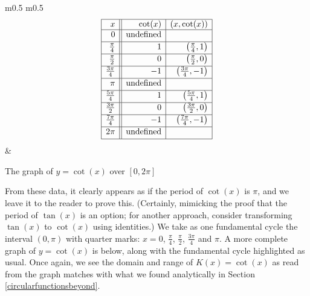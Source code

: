 \hskip-20pt\begin{minipage}{\textwidth}
\begin{center}
\begin{tabular}{m{} m{}}
\setlength{\extrarowheight}{2pt}
\[ \begin{array}{|r||r|r|}  

\hline

 x & \cot(x) & (x,\cot(x)) \\ \hline
0  & \text{undefined} &  \\ [2pt]   \hline
\frac{\pi}{4}  & 1 & \left(\frac{\pi}{4},1 \right) \\ [2pt] \hline 
\frac{\pi}{2}  & 0 & \left(\frac{\pi}{2},0 \right)  \\ [2pt] \hline 
\frac{3\pi}{4}  & -1 & \left(\frac{3\pi}{4}, -1\right) \\ [2pt] \hline 
\pi & \text{undefined} &  \\ [2pt] \hline 
\frac{5\pi}{4}  & 1 & \left(\frac{5\pi}{4}, 1 \right) \\ [2pt] \hline 
\frac{3\pi}{2}  & 0 & \left(\frac{3\pi}{2}, 0 \right) \\ [2pt] \hline 
\frac{7\pi}{4}  & -1 & \left(\frac{7\pi}{4}, -1 \right) \\ [2pt] \hline 
2\pi  & \text{undefined} &  \\  [2pt] \hline
\end{array} \] \setlength{\extrarowheight}{0pt} & 

\end{tabular}
\end{center}
\captionsetup{type=figure}
\caption{The graph of $y = \cot(x)$ over $[0,2\pi]$}\label{fig:cotgraph1}
\end{minipage}

\medskip


From these data, it clearly appears as if the period of $\cot(x)$ is $\pi$, and we leave it to the reader to prove this. (Certainly, mimicking the proof that the period of $\tan(x)$ is an option;  for another approach, consider transforming $\tan(x)$ to $\cot(x)$ using identities.)  We take as one fundamental cycle the interval $(0,\pi)$ with quarter marks:  $x= 0$, $\frac{\pi}{4}$, $\frac{\pi}{2}$, $\frac{3\pi}{4}$ and $\pi$.  A more complete graph of $y=\cot(x)$ is below, along with the fundamental cycle highlighted as usual.  Once again, we see the domain and range of $K(x) = \cot(x)$ as read from the graph matches with what we found analytically in Section \ref{circularfunctionsbeyond}.     

